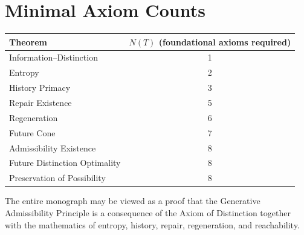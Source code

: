 \documentclass[12pt,twoside,openright]{book}
\begin{document}
\section{Minimal Axiom Counts}

\begin{center}
\begin{tabular}{lc}
\toprule
Theorem & $N(T)$ (foundational axioms required) \\
\midrule
Information--Distinction & 1 \\
Entropy & 2 \\
History Primacy & 3 \\
Repair Existence & 5 \\
Regeneration & 6 \\
Future Cone & 7 \\
Admissibility Existence & 8 \\
Future Distinction Optimality & 8 \\
Preservation of Possibility & 8 \\
\bottomrule
\end{tabular}
\end{center}

The entire monograph may be viewed as a proof that the
Generative Admissibility Principle is a consequence of
the Axiom of Distinction together with the mathematics
of entropy, history, repair, regeneration, and
reachability.

\printglossaries

\printbibliography[heading=bibintoc,title={References}]

\end{document}
